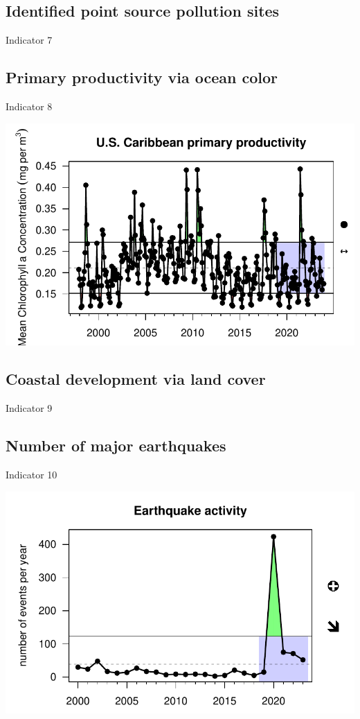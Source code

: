 \documentclass[
  letterpaper,
  oneside,
  open=any]{scrbook}
\begin{document}
\subsection{Identified point source pollution
sites}\label{identified-point-source-pollution-sites}

Indicator 7

\subsection{Primary productivity via ocean
color}\label{primary-productivity-via-ocean-color}

Indicator 8

\includegraphics{Report_book_files/Risk_indicators_files/figure-pdf/unnamed-chunk-9-1.pdf}

\subsection{Coastal development via land
cover}\label{coastal-development-via-land-cover}

Indicator 9

\subsection{Number of major
earthquakes}\label{number-of-major-earthquakes}

Indicator 10

\includegraphics{Report_book_files/Risk_indicators_files/figure-pdf/unnamed-chunk-10-1.pdf}
\end{document}

